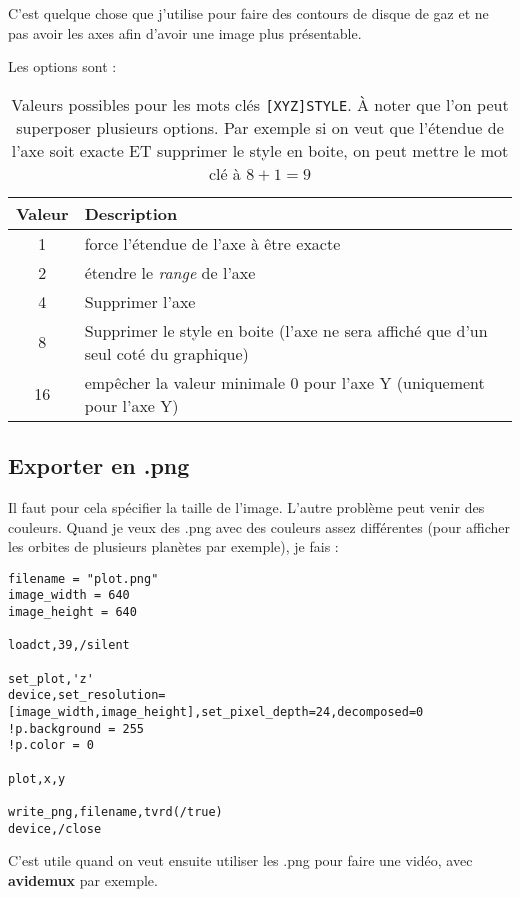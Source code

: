 \documentclass[a4paper,twoside]{article}
\begin{document}
C'est quelque chose que j'utilise pour faire des contours de disque de gaz et ne pas avoir les axes afin d'avoir une image plus présentable.

Les options sont :
\begin{table}[htb]
\centering
\begin{center}
\begin{tabular}{|c|p{5cm}|}\hline
Valeur & Description\\\hline
1 & force l'étendue de l'axe à être exacte\\\hline
2 & étendre le \emph{range} de l'axe\\\hline
4 & Supprimer l'axe\\\hline
8 & Supprimer le style en boite (l'axe ne sera affiché que d'un seul coté du graphique)\\\hline
16 & empêcher la valeur minimale 0 pour l'axe Y (uniquement pour l'axe Y)\\\hline
\end{tabular}
\end{center}

\caption{Valeurs possibles pour les mots clés \texttt{[XYZ]STYLE}. À noter que l'on peut superposer plusieurs options. Par exemple si on veut que l'étendue de l'axe soit exacte ET supprimer le style en boite, on peut mettre le mot clé à $8+1=9$}
\end{table}

\subsection{Exporter en .png}
Il faut pour cela spécifier la taille de l'image. L'autre problème peut venir des couleurs. Quand je veux des .png avec des couleurs assez différentes (pour afficher les orbites de plusieurs planètes par exemple), je fais :
\begin{lstlisting}[language=IDL]
filename = "plot.png"
image_width = 640
image_height = 640

loadct,39,/silent

set_plot,'z'
device,set_resolution=[image_width,image_height],set_pixel_depth=24,decomposed=0
!p.background = 255
!p.color = 0

plot,x,y

write_png,filename,tvrd(/true)
device,/close
\end{lstlisting}

C'est utile quand on veut ensuite utiliser les .png pour faire une vidéo, avec \textbf{avidemux} par exemple.
\end{document}
